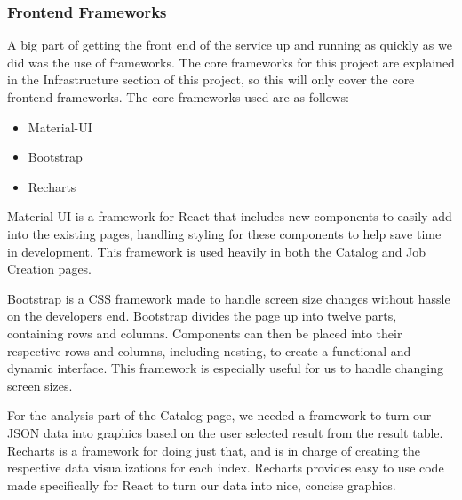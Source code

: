 \subsubsection{Frontend Frameworks}
A big part of getting the front end of the service up and running as quickly as we did was the use of frameworks. The core frameworks for this project are explained in the Infrastructure section of this project, so this will only cover the core frontend frameworks. The core frameworks used are as follows:
\begin{itemize}
  \item Material-UI
  \item Bootstrap
  \item Recharts
\end{itemize}
Material-UI is a framework for React that includes new components to easily add into the existing pages, handling styling for these components to help save time in development. This framework is used heavily in both the Catalog and Job Creation pages.\par
Bootstrap is a CSS framework made to handle screen size changes without hassle on the developer\textquotesingle s end. Bootstrap divides the page up into twelve parts, containing rows and columns. Components can then be placed into their respective rows and columns, including nesting, to create a functional and dynamic interface. This framework is especially useful for us to handle changing screen sizes.\par
For the analysis part of the Catalog page, we needed a framework to turn our JSON data into graphics based on the user selected result from the result table. Recharts is a framework for doing just that, and is in charge of creating the respective data visualizations for each index. Recharts provides easy to use code made specifically for React to turn our data into nice, concise graphics.

